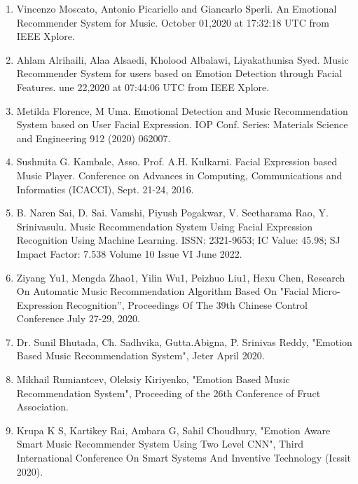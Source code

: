 \documentclass[12pt]{report}
\begin{document}
\begin{enumerate}


\item Vincenzo Moscato, Antonio Picariello and Giancarlo Sperli. An Emotional Recommender 
System for Music. October 01,2020 at 17:32:18 UTC from IEEE Xplore.

\item Ahlam Alrihaili, Alaa Alsaedi, Kholood Albalawi, Liyakathunisa Syed. Music  
Recommender System for users based on Emotion Detection through Facial Features. une 
22,2020 at 07:44:06 UTC from IEEE Xplore.

\item Metilda Florence, M Uma. Emotional Detection and Music Recommendation System based 
on User Facial Expression. IOP Conf. Series: Materials Science and Engineering 912 
(2020) 062007.

\item Sushmita G. Kambale, Asso. Prof. A.H. Kulkarni. Facial Expression based Music Player. 
Conference on Advances in Computing, Communications and Informatics (ICACCI), 
Sept. 21-24, 2016.

\item B. Naren Sai, D. Sai. Vamshi, Piyush Pogakwar, V. Seetharama Rao, Y. Srinivasulu. 
Music Recommendation System Using Facial Expression Recognition Using Machine 
Learning. ISSN: 2321-9653; IC Value: 45.98; SJ Impact Factor: 7.538 Volume 10 Issue 
VI June 2022.
\item Ziyang Yu1, Mengda Zhao1, Yilin Wu1, Peizhuo Liu1, Hexu Chen, Research On 
Automatic Music Recommendation Algorithm Based On "Facial Micro-Expression 
Recognition”, Proceedings Of The 39th Chinese Control Conference July 27-29, 2020. 
\item Dr. Sunil Bhutada, Ch. Sadhvika, Gutta.Abigna, P. Srinivas Reddy, "Emotion Based 
Music Recommendation System", Jeter April 2020. 
\item Mikhail Rumiantcev, Oleksiy Kiriyenko, "Emotion Based Music Recommendation 
System", Proceeding of the 26th Conference of Fruct Association.

\item Krupa K S, Kartikey Rai, Ambara G, Sahil Choudhury, "Emotion Aware Smart Music 
Recommender System Using Two Level CNN", Third International Conference On Smart 
Systems And Inventive Technology (Icssit 2020).



\end{enumerate}
\clearpage


\end{document}
